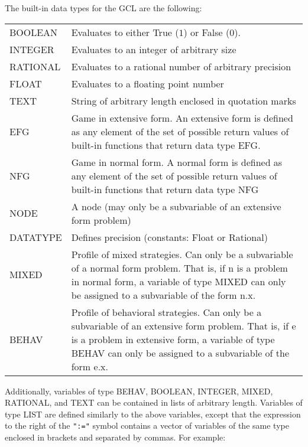 The built-in data types for the GCL are the following:  

\medskip

\begin{tabular}{lp{4in}}
BOOLEAN & Evaluates to either True ($1$) or False ($0$). \\ 

INTEGER & Evaluates to an integer of arbitrary size \\ 

RATIONAL & Evaluates to a rational number of arbitrary precision\\ 

FLOAT 	& Evaluates to a floating point number \\

TEXT	& String of arbitrary length enclosed in quotation marks\\ 

EFG	& Game in extensive form.  An extensive form is defined as any
element of the set of possible return values of built-in functions
that return data type EFG.\\

NFG	& Game in normal form.  A normal form is defined as any
element of the set of possible return values of built-in functions
that return data type NFG\\

NODE	& A node (may only be a subvariable of an extensive
form problem) \\ 

DATATYPE & Defines precision (constants: Float or
Rational) \\ 

MIXED	& {Profile of mixed strategies.  Can only be a
subvariable of a normal form problem.  That is, if n is a problem in
normal form, a variable of type MIXED can only be assigned to a
subvariable of the form n.x.}\\ 

BEHAV	& Profile of behavioral
strategies.  Can only be a subvariable of an extensive form problem.
That is, if e is a problem in extensive form, a variable of type BEHAV
can only be assigned to a subvariable of the form e.x. \\
\end{tabular}

\medskip

\noindent
Additionally, variables of type BEHAV, BOOLEAN, INTEGER, MIXED,
RATIONAL, and TEXT can be contained in lists of arbitrary length.
Variables of type LIST are defined similarly to the above variables,
except that the expression to the right of the {\tt ":="} symbol
contains a vector of variables of the same type enclosed in brackets
and separated by commas.  For example:

